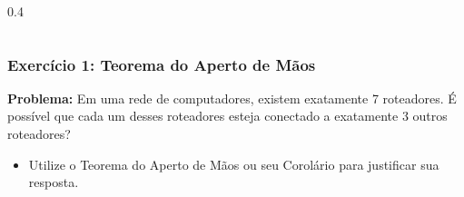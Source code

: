 \documentclass[9pt]{beamer}
\begin{document}
\begin{frame}
\begin{columns}
\begin{column}{0.4\textwidth}
\begin{center}
            \end{center}
        \end{column}
    \end{columns}
\end{frame}

\begin{frame}
    \frametitle{Exercício 1: Teorema do Aperto de Mãos}
    \textbf{Problema:} Em uma rede de computadores, existem exatamente 7 roteadores. 
    É possível que cada um desses roteadores esteja conectado a exatamente 3 outros roteadores?
    \vspace{0.5cm}
    \begin{itemize}
        \item Utilize o Teorema do Aperto de Mãos ou seu Corolário para justificar sua resposta.
    \end{itemize}
\end{frame}
\end{document}
